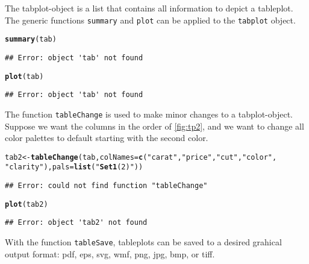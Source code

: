 \documentclass[11pt, fleqn, a4paper]{article}\usepackage{graphicx, color}
\makeatletter
\newcommand{\hlfunctioncall}[1]{\textcolor[rgb]{0.501960784313725,0,0.329411764705882}{\textbf{#1}}}%
\newcommand{\hlstring}[1]{\textcolor[rgb]{0.6,0.6,1}{#1}}%
\newenvironment{kframe}{%
 \def\FrameCommand##1{\hskip\@totalleftmargin \hskip-\fboxsep
 \colorbox{shadecolor}{##1}\hskip-\fboxsep
     \hskip-\linewidth \hskip-\@totalleftmargin \hskip\columnwidth}%
 \MakeFramed {\advance\hsize-\width
   \@totalleftmargin\z@ \linewidth\hsize
   \@setminipage}}%
 {\par\unskip\endMakeFramed}
\newenvironment{knitrout}{}{} %
\makeatother
\begin{document}
The tabplot-object is a list that contains all information to depict a tableplot. The generic functions {\tt summary} and {\tt plot} can be applied to the {\tt tabplot} object.

\begin{knitrout}
\color{fgcolor}\begin{kframe}
\begin{alltt}
\hlfunctioncall{summary}(tab)
\end{alltt}
\begin{verbatim}
## Error: object 'tab' not found
\end{verbatim}
\begin{alltt}
\hlfunctioncall{plot}(tab)
\end{alltt}
\begin{verbatim}
## Error: object 'tab' not found
\end{verbatim}
\end{kframe}
\end{knitrout}


The function {\tt tableChange} is used to make minor changes to a tabplot-object. Suppose we want the columns in the order of \ref{fig:tp2}, and we want to change all color palettes to default starting with the second color.

\begin{knitrout}
\color{fgcolor}\begin{kframe}
\begin{alltt}
tab2 <- \hlfunctioncall{tableChange}(tab, colNames = \hlfunctioncall{c}(\hlstring{"carat"}, \hlstring{"price"}, \hlstring{"cut"}, \hlstring{"color"}, 
    \hlstring{"clarity"}), pals = \hlfunctioncall{list}(\hlstring{"\hlfunctioncall{Set1}(2)"}))
\end{alltt}
\begin{verbatim}
## Error: could not find function "tableChange"
\end{verbatim}
\begin{alltt}
\hlfunctioncall{plot}(tab2)
\end{alltt}
\begin{verbatim}
## Error: object 'tab2' not found
\end{verbatim}
\end{kframe}
\end{knitrout}


With the function {\tt tableSave}, tableplots can be saved to a desired grahical output format: pdf, eps, svg, wmf, png, jpg, bmp, or tiff.
\end{document}
